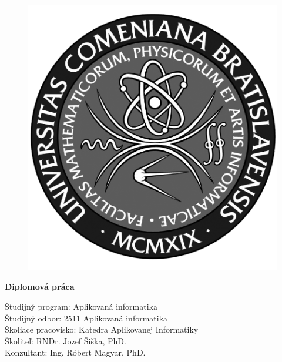 \newpage
\begin{center}
\centerline{\LARGE\sc\textbf\skola}
\sc\LARGE\textbf\fakulta
\end{center}

\vspace*{2.5cm}

\begin{figure}[!hbt]
	\begin{center}
		\includegraphics{img/logo_fmph_dark}
		\label{img:logo}
	\end{center}
\end{figure}

\begin{center}
\begin{minipage}{0.8\textwidth}
\begin{center}
 \LARGE\sc\textbf\nazov 
\end{center}
\vspace{1em}
\centerline{\Large\bf Diplomová práca}
\end{minipage}
\end{center}

\vspace{4cm}

\selectfont

\noindent
Študijný program: \hspace{0.3em} Aplikovaná informatika\\
Študijný odbor:  \hspace{1.4em} 2511 Aplikovaná informatika\\
Školiace pracovisko: Katedra Aplikovanej Informatiky\\
Školiteľ:  \hspace{4.8em} RNDr. Jozef Šiška, PhD.\\
Konzultant: \hspace{3.2em} Ing. Róbert Magyar, PhD.

